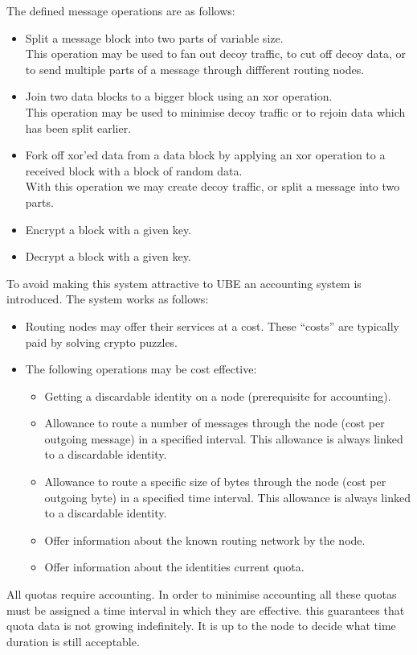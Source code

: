 The defined message operations are as follows:
\begin{itemize}
	\item Split a message block into two parts of variable size.\\
	This operation may be used to fan out decoy traffic, to cut off decoy data, or to send multiple parts of a message through diffferent routing nodes.
	\item Join two data blocks to a bigger block using an xor operation.\\
	This operation may be used to minimise decoy traffic or to rejoin data which has been split earlier.
	\item Fork off xor'ed data from a data block by applying an xor operation to a received block with a block of random data.\\
	With this operation we may create decoy traffic, or split a message into two parts.
	\item Encrypt a block with a given key.      
	\item Decrypt a block with a given key.
\end{itemize}

To avoid making this system attractive to UBE an accounting system is introduced. The system works as follows:
\begin{itemize}
	\item Routing nodes may offer their services at a cost. These ``costs'' are typically paid by solving crypto puzzles.
	\item The following operations may be cost effective:
	\begin{itemize}
		\item Getting a discardable identity on a node (prerequisite for accounting).
		\item Allowance to route a number of messages through the node (cost per outgoing message) in a specified interval. This allowance is always linked to a discardable identity.
		\item Allowance to route a specific size of bytes through the node (cost per outgoing byte) in a specified time interval. This allowance is always linked to a discardable identity.
		\item Offer information about the known routing network by the node.
		\item Offer information about the identities current quota.
	\end{itemize}
\end{itemize}
All quotas require accounting. In order to minimise accounting all these quotas must be assigned a time interval in which they are effective. this guarantees that quota data is not growing indefinitely. It is up to the node to decide what time duration is still acceptable.

